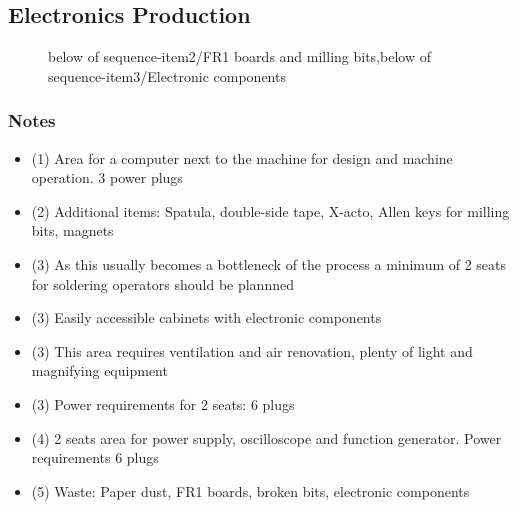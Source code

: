 \documentclass[a4paper,12pt,titlepage]{article}
\begin{document}
\subsection{Electronics Production}
\begin{figure}[h]
\centering
{}
{below of sequence-item2/{FR1 boards and milling bits},below of sequence-item3/Electronic components}
\vspace{1cm}
\end{figure}
\subsubsection*{Notes}
\begin{itemize}
\item (1) Area for a computer next to the machine for design and machine operation. 3 power plugs
\item (2) Additional items: Spatula, double-side tape, X-acto, Allen keys for milling bits, magnets
\item (3) As this usually becomes a bottleneck of the process a minimum of 2 seats for soldering operators should be plannned
\item (3) Easily accessible cabinets with electronic components
\item (3) This area requires ventilation and air renovation, plenty of light and magnifying equipment
\item (3) Power requirements for 2 seats: 6 plugs
\item (4) 2 seats area for power supply, oscilloscope and function generator. Power requirements 6 plugs
\item (5) Waste: Paper dust, FR1 boards, broken bits, electronic components
\end{itemize}
\end{document}
